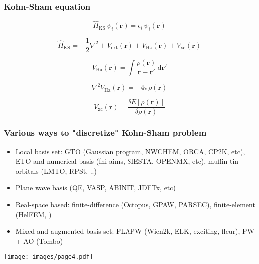 \documentclass[english,9pt]{beamer}
\begin{document}
\begin{frame}
\frametitle{Kohn-Sham equation}

\begin{equation}
\hat{H}_{\mathrm{KS}}\,\psi_{i}(\mathbf{r}) = \epsilon_{i}\,\psi_{i}(\mathbf{r})
\end{equation}

\begin{equation}
\hat{H}_{\mathrm{KS}} = -\frac{1}{2}\nabla^{2} + V_{\mathrm{ext}}(\mathbf{r}) +
V_{\mathrm{Ha}}(\mathbf{r}) + V_{\mathrm{xc}}(\mathbf{r})
\end{equation}

\begin{equation}
V_{\mathrm{Ha}}(\mathbf{r}) = \int
\frac{\rho(\mathbf{r})}{\mathbf{r} - \mathbf{r}'}\,\mathrm{d}\mathbf{r}'
\end{equation}

\begin{equation}
\nabla^2 V_{\mathrm{Ha}}(\mathbf{r}) = -4\pi\rho(\mathbf{r})
\end{equation}

\begin{equation}
V_{\mathrm{xc}}(\mathbf{r}) = \frac{\delta E[\rho(\mathbf{r})]}{\delta \rho(\mathbf{r})}
\end{equation}

\end{frame}


\begin{frame}
\frametitle{Various ways to "discretize" Kohn-Sham problem}

\begin{itemize}
\item Local basis set: GTO (Gaussian program, NWCHEM, ORCA, CP2K, etc),
  ETO and numerical basis (fhi-aims, SIESTA, OPENMX, etc),
  muffin-tin orbitals (LMTO, RPSt, ..)
\item Plane wave basis (QE, VASP, ABINIT, JDFTx, etc)
\item Real-space based: finite-difference (Octopus, GPAW, PARSEC), finite-element (HelFEM, )
\item Mixed and augmented basis set: FLAPW (Wien2k, ELK, exciting, fleur),
  PW + AO (Tombo)
\end{itemize}

\end{frame}


\begin{frame}[plain]

\texttt{[image: images/page4.pdf]}

\end{frame}
\end{document}
